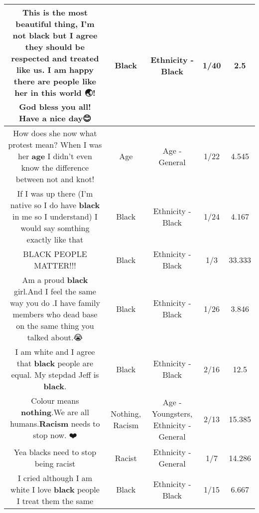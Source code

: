 \documentclass[11pt]{article}
\newlength\mylength
\begin{document}
\begin{center}
\begin{longtable}{|C{.65\mylength}|C{.30\mylength}|C{.12\mylength}|C{.12\mylength}|C{.12\mylength}|}
  \small This is the most beautiful thing, I'm not \textbf{black} but I agree they should be  respected and treated like us. I am happy there are people like her in this world 🌏! God bless you all! Have a nice day😊\normalsize   & Black & Ethnicity - Black & 1/40 & 2.5 \\  \hline
  \small How does she now what protest mean? When I was her \textbf{age} I didn't even know the difference between not and knot!\normalsize   & Age & Age - General & 1/22 & 4.545 \\  \hline
  \small If I was up there (I'm native so I do have \textbf{black} in me so I understand) I would say somthing exactly like that\normalsize   & Black & Ethnicity - Black & 1/24 & 4.167 \\  \hline
  \small BLACK PEOPLE MATTER!!!\normalsize   & Black & Ethnicity - Black & 1/3 & 33.333 \\  \hline
  \small Am a proud \textbf{black} girl.And I feel the same way you do .I have family members who dead base on the same thing you talked about.😭\normalsize   & Black & Ethnicity - Black & 1/26 & 3.846 \\  \hline
  \small I am white and I agree that \textbf{black} people are equal. My stepdad Jeff is \textbf{black}.\normalsize   & Black & Ethnicity - Black & 2/16 & 12.5 \\  \hline
  \small Colour means \textbf{nothing}.We are all humans.\textbf{Racism} needs to stop now. ❤️\normalsize   & Nothing, Racism & Age - Youngsters, Ethnicity - General & 2/13 & 15.385 \\  \hline
  \small Yea blacks need to stop being racist\normalsize   & Racist & Ethnicity - General & 1/7 & 14.286 \\  \hline
  \small I cried although I am white I love \textbf{black} people I treat them the same\normalsize   & Black & Ethnicity - Black & 1/15 & 6.667 \\  \hline

\end{longtable}
\end{center}
\end{document}
